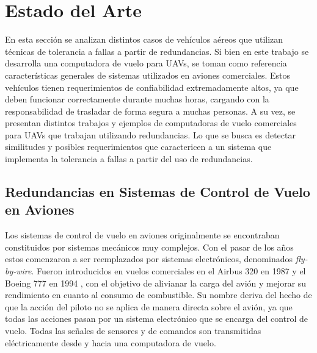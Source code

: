 
\section{Estado del Arte}\label{sec:estado_del_arte}


En esta sección se analizan distintos casos de vehículos aéreos que utilizan técnicas de tolerancia a fallas a partir de redundancias. Si bien en este trabajo se desarrolla una computadora de vuelo para UAVs, se toman como referencia características generales de sistemas utilizados en aviones comerciales. Estos vehículos tienen requerimientos de confiabilidad extremadamente altos, ya que deben funcionar correctamente durante muchas horas, cargando con la responsabilidad de trasladar de forma segura a muchas personas. A su vez, se presentan distintos trabajos y ejemplos de computadoras de vuelo comerciales para UAVs que trabajan utilizando redundancias. Lo que se busca es detectar similitudes y posibles requerimientos que caractericen a un sistema que implementa la tolerancia a fallas a partir del uso de redundancias.

\subsection{Redundancias en Sistemas de Control de Vuelo en Aviones}

Los sistemas de control de vuelo en aviones originalmente se encontraban constituidos por sistemas mecánicos muy complejos. Con el pasar de los años estos comenzaron a ser reemplazados por sistemas electrónicos, denominados \textit{fly-by-wire}. Fueron introducidos en vuelos comerciales en el Airbus 320 en 1987 y el Boeing 777 en 1994 \cite{FBWNASA}, con el objetivo de alivianar la carga del avión y mejorar su rendimiento en cuanto al consumo de combustible. Su nombre deriva del hecho de que la acción del piloto no se aplica de manera directa sobre el avión, ya que todas las acciones pasan por un sistema electrónico que se encarga del control de vuelo. Todas las señales de sensores y de comandos son transmitidas eléctricamente desde y hacia una computadora de vuelo.

